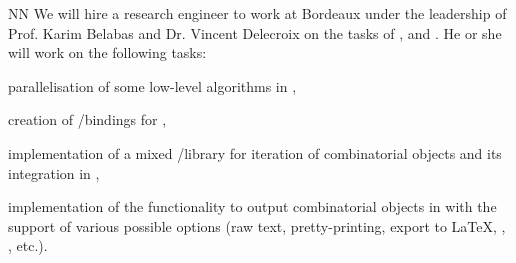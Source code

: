 \begin{participant}[type=R, PM=48]{NN}
We will hire a research engineer to work at Bordeaux
 under the leadership of Prof. Karim Belabas and Dr. Vincent
Delecroix on the tasks of ,  and .
He or she will work on the following tasks:
\begin{compactitem}
\item parallelisation of some low-level algorithms in \PariGP,
\item creation of \Cython/\Python bindings for \PariGP,
\item implementation of a mixed /\Python library for iteration of combinatorial
objects and its integration in \Sage,
\item implementation of the functionality to output combinatorial objects in \Sage
with the support of various possible options (raw text, pretty-printing, export to 
\LaTeX, , , etc.).
\end{compactitem}
\end{participant}
